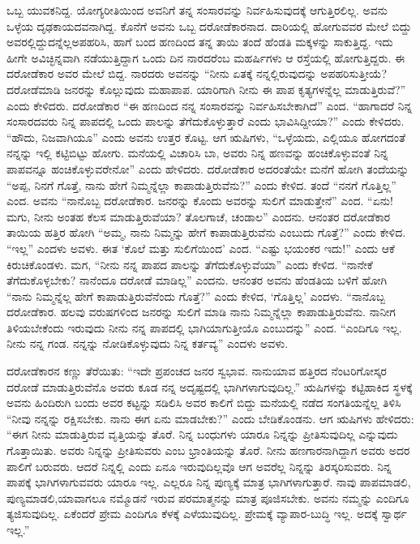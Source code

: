 ಒಬ್ಬ ಯುವಕನಿದ್ದ. ಯೋಗ್ಯರೀತಿಯಿಂದ ಅವನಿಗೆ ತನ್ನ ಸಂಸಾರವನ್ನು ನಿರ್ವಹಿಸುವುದಕ್ಕೆ ಆಗುತ್ತಿರಲಿಲ್ಲ. ಅವನು ಒಳ್ಳೆಯ ದೃಢಕಾಯದವನಾಗಿದ್ದ. ಕೊನೆಗೆ ಅವನು ಒಬ್ಬ ದರೋಡೆಕಾರನಾದ. ದಾರಿಯಲ್ಲಿ ಹೋಗುವವರ ಮೇಲೆ ಬಿದ್ದು ಅವರಲ್ಲಿದ್ದುದನ್ನೆಲ್ಲ\break ಅಪಹರಿಸಿ, ಹಾಗೆ ಬಂದ ಹಣದಿಂದ ತನ್ನ ತಾಯಿ ತಂದೆ ಹೆಂಡತಿ ಮಕ್ಕಳನ್ನು ಸಾಕುತ್ತಿದ್ದ. ಇದು ಹೀಗೇ ಅವಿಚ್ಛಿನ್ನವಾಗಿ ನಡೆಯುತ್ತಿದ್ದಾಗ ಒಂದು ದಿನ ನಾರದರೆಂಬ ಮಹರ್ಷಿಗಳು ಆ ರಸ್ತೆಯಲ್ಲಿ ಹೋಗುತ್ತಿದ್ದರು. ಈ ದರೋಡೆಕಾರ ಅವರ ಮೇಲೆ ಬಿದ್ದ. ನಾರದರು ಅವನನ್ನು “ನೀನು ಏತಕ್ಕೆ ನನ್ನಲ್ಲಿರುವುದನ್ನು ಅಪಹರಿಸುತ್ತೀಯೆ? ದರೋಡೆಮಾಡಿ ಜನರನ್ನು ಕೊಲ್ಲುವುದು ಮಹಾಪಾಪ. ಯಾರಿಗಾಗಿ ನೀನು ಈ ಪಾಪ ಕೃತ್ಯಗಳನ್ನೆಲ್ಲ ಮಾಡುತ್ತಿರುವೆ?” ಎಂದು ಕೇಳಿದರು. ದರೋಡೆಕಾರ “ಈ ಹಣದಿಂದ ನನ್ನ ಸಂಸಾರವನ್ನು ನಿರ್ವಹಿಸಬೇಕಾಗಿದೆ” ಎಂದ. “ಹಾಗಾದರೆ ನಿನ್ನ ಸಂಸಾರದವರು ನಿನ್ನ ಪಾಪದಲ್ಲಿ ಒಂದು ಪಾಲನ್ನು ತೆಗೆದುಕೊಳ್ಳುತ್ತಾರೆ ಎಂದು ಭಾವಿಸಿದ್ದೀಯಾ?” ಎಂದು ಕೇಳಿದರು. “ಹೌದು, ನಿಜವಾಗಿಯೂ” ಎಂದು ಅವನು ಉತ್ತರ ಕೊಟ್ಟ. ಆಗ ಋಷಿಗಳು, “ಒಳ್ಳೆಯದು, ಎಲ್ಲಿಯೂ ಹೋಗದಂತೆ ನನ್ನನ್ನು ಇಲ್ಲಿ ಕಟ್ಟಿಬಿಟ್ಟು ಹೋಗು. ಮನೆಯಲ್ಲಿ ವಿಚಾರಿಸಿ ಬಾ, ಅವರು ನಿನ್ನ ಹಣವನ್ನು ಹಂಚಿಕೊಳ್ಳುವಂತೆ ನಿನ್ನ ಪಾಪವನ್ನೂ ಹಂಚಿಕೊಳ್ಳುವರೇನೋ” ಎಂದು ಹೇಳಿದರು. ದರೋಡೆಕಾರ ಅದರಂತೆಯೇ ಮನೆಗೆ ಹೋಗಿ ತಂದೆಯನ್ನು “ಅಪ್ಪ, ನಿನಗೆ ಗೊತ್ತೆ, ನಾನು ಹೇಗೆ ನಿಮ್ಮನ್ನೆಲ್ಲಾ ಕಾಪಾಡುತ್ತಿರುವೆನು?” ಎಂದು ಕೇಳಿದ. ತಂದೆ “ನನಗೆ ಗೊತ್ತಿಲ್ಲ” ಎಂದ. ಅವನು “ನಾನೊಬ್ಬ ದರೋಡೆಕಾರ. ಜನರನ್ನು ಕೊಂದು ಅವರನ್ನು ಸುಲಿಗೆ ಮಾಡುತ್ತೇನೆ” ಎಂದ. “ಏನು! ಮಗು, ನೀನು ಅಂತಹ ಕೆಲಸ ಮಾಡುತ್ತಿರುವೆಯಾ? ತೊಲಗಾಚೆ, ಚಂಡಾಲ” ಎಂದನು. ಆನಂತರ ದರೋಡೆಕಾರ ತಾಯಿಯ ಹತ್ತಿರ ಹೋಗಿ “ಅಮ್ಮ, ನಾನು ನಿಮ್ಮನ್ನು ಹೇಗೆ ಕಾಪಾಡುತ್ತಿರುವೆನು ಎಂಬುದು ಗೊತ್ತೆ?” ಎಂದು ಕೇಳಿದ. “ಇಲ್ಲ” ಎಂದಳು ಅವಳು. ಈತ ‘ಕೊಲೆ ಮತ್ತು ಸುಲಿಗೆಯಿಂದ’ ಎಂದ. “ಎಷ್ಟು ಭಯಂಕರ ಇದು!” ಎಂದು ಆಕೆ ಕಿರುಚಿಕೊಂಡಳು. ಮಗ, “ನೀನು ನನ್ನ ಪಾಪದ ಪಾಲನ್ನು ತೆಗೆದುಕೊಳ್ಳುವೆಯಾ” ಎಂದು ಕೇಳಿದ. “ನಾನೇಕೆ ತೆಗೆದುಕೊಳ್ಳಬೇಕು? ನಾನೆಂದೂ ದರೋಡೆ ಮಾಡಿಲ್ಲ” ಎಂದನು. ಆನಂತರ ಅವನು ಹೆಂಡತಿಯ ಬಳಿಗೆ ಹೋಗಿ “ನಾನು ನಿಮ್ಮನ್ನೆಲ್ಲ ಹೇಗೆ ಕಾಪಾಡುತ್ತಿರುವೆನೆಂದು ಗೊತ್ತೆ?” ಎಂದು ಕೇಳಿದ, ‘ಗೊತ್ತಿಲ್ಲ’ ಎಂದಳು. “ನಾನೊಬ್ಬ ದರೋಡೆಕಾರ. ಹಲವು ವರುಷಗಳಿಂದ ಜನರನ್ನು ಸುಲಿಗೆ ಮಾಡಿ ನಾನು ನಿಮ್ಮನ್ನೆಲ್ಲಾ ಕಾಪಾಡುತ್ತಿರುವೆನು. ನಾನೀಗ ತಿಳಿಯಬೇಕೆಂದು ಇರುವುದು ನೀನು ನನ್ನ ಪಾಪದಲ್ಲಿ ಭಾಗಿಯಾಗುತ್ತೀಯೊ ಎಂಬುದನ್ನು” ಎಂದ. “ಎಂದಿಗೂ ಇಲ್ಲ. ನೀನು ನನ್ನ ಗಂಡ. ನನ್ನನ್ನು ನೋಡಿಕೊಳ್ಳುವುದು ನಿನ್ನ ಕರ್ತವ್ಯ” ಎಂದಳು ಅವಳು.

\vskip 3pt

ದರೋಡೆಕಾರನ ಕಣ್ಣು ತೆರೆಯಿತು: “ಇದೇ ಪ್ರಪಂಚದ ಜನರ ಸ್ವಭಾವ. ನಾನು\break ಯಾವ ಹತ್ತಿರದ ನೆಂಟರಿಗೋಸ್ಕರ ದರೋಡೆ ಮಾಡುತ್ತಿರುವೆನೊ ಅವರು ಕೂಡ ನನ್ನ ಅದೃಷ್ಟದಲ್ಲಿ ಭಾಗಿಗಳಾಗುವುದಿಲ್ಲ.” ಋಷಿಗಳನ್ನು ಕಟ್ಟಿಹಾಕಿದ ಸ್ಥಳಕ್ಕೆ ಅವನು ಹಿಂದಿರುಗಿ ಬಂದು ಅವರ ಕಟ್ಟನ್ನು ಸಡಿಲಿಸಿ ಅವರ ಕಾಲಿಗೆ ಬಿದ್ದು ಮನೆಯಲ್ಲಿ ನಡೆದ ಸಂಗತಿಯನ್ನೆಲ್ಲ ತಿಳಿಸಿ “ನೀವು ನನ್ನನ್ನು ರಕ್ಷಿಸಬೇಕು. ನಾನು ಈಗ ಏನು ಮಾಡಬೇಕು?” ಎಂದು ಬೇಡಿಕೊಂಡನು. ಆಗ ಋಷಿಗಳು ಹೇಳಿದರು: “ಈಗ ನೀನು ಮಾಡುತ್ತಿರುವ ವೃತ್ತಿಯನ್ನು ತೊರೆ. ನಿನ್ನ ಬಂಧುಗಳು ಯಾರೂ ನಿನ್ನನ್ನು ಪ್ರೀತಿಸುವುದಿಲ್ಲ ಎನ್ನುವುದು ಗೊತ್ತಾಯಿತು. ಅವರು ನಿನ್ನನ್ನು ಪ್ರೀತಿಸುವರು ಎಂಬ ಭ್ರಾಂತಿಯನ್ನು ತೊರೆ. ನೀನು ಹಣಗಾರನಾಗಿದ್ದಾಗ ಅವರು ಅದರ ಪಾಲಿಗೆ ಬರುವರು. ಆದರೆ ನಿನ್ನಲ್ಲಿ ಎಂದು ಏನೂ ಇರುವುದಿಲ್ಲವೊ ಆಗ ಅವರೆಲ್ಲ ನಿನ್ನನ್ನು ತಿರಸ್ಕರಿಸುವರು. ನಿನ್ನ ಪಾಪಕ್ಕೆ ಭಾಗಿಗಳಾಗುವವರು ಯಾರೂ ಇಲ್ಲ. ಎಲ್ಲರೂ ನಿನ್ನ ಪುಣ್ಯಕ್ಕೆ ಮಾತ್ರ ಭಾಗಿಗಳಾಗುತ್ತಾರೆ. ನಾವು ಪಾಪಮಾಡಲಿ, ಪುಣ್ಯಮಾಡಲಿ,\break ಯಾವಾಗಲೂ ನಮ್ಮೊಡನೆ ಇರುವ ಪರಮಾತ್ಮನನ್ನು ಮಾತ್ರ ಪೂಜಿಸಬೇಕು. ಅವನು ನಮ್ಮನ್ನು ಎಂದಿಗೂ ತ್ಯಜಿಸುವುದಿಲ್ಲ. ಏಕೆಂದರೆ ಪ್ರೇಮ ಎಂದಿಗೂ ಕೆಳಕ್ಕೆ ಎಳೆಯುವುದಿಲ್ಲ. ಪ್ರೇಮಕ್ಕೆ ವ್ಯಾಪಾರ-ಬುದ್ಧಿ ಇಲ್ಲ. ಅದಕ್ಕೆ ಸ್ವಾರ್ಥ ಇಲ್ಲ.”

